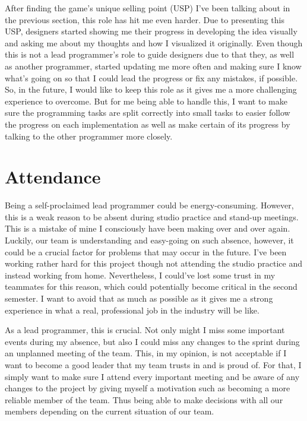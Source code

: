 \documentclass{scrartcl}
\begin{document}
After finding the game's unique selling point (USP) I've been talking about in the previous section, this role has hit me even harder. Due to presenting this USP, designers started showing me their progress in developing the idea visually and asking me about my thoughts and how I visualized it originally. Even though this is not a lead programmer's role to guide designers due to that they, as well as another programmer, started updating me more often and making sure I know what's going on so that I could lead the progress or fix any mistakes, if possible. So, in the future, I would like to keep this role as it gives me a more challenging experience to overcome. But for me being able to handle this, I want to make sure the programming tasks are split correctly into small tasks to easier follow the progress on each implementation as well as make certain of its progress by talking to the other programmer more closely.

\section{Attendance}
Being a self-proclaimed lead programmer could be energy-consuming. However, this is a weak reason to be absent during studio practice and stand-up meetings. This is a mistake of mine I consciously have been making over and over again. Luckily, our team is understanding and easy-going on such absence, however, it could be a crucial factor for problems that may occur in the future. I've been working rather hard for this project though not attending the studio practice and instead working from home. Nevertheless, I could've lost some trust in my teammates for this reason, which could potentially become critical in the second semester. I want to avoid that as much as possible as it gives me a strong experience in what a real, professional job in the industry will be like. 

As a lead programmer, this is crucial. Not only might I miss some important events during my absence, but also I could miss any changes to the sprint during an unplanned meeting of the team. This, in my opinion, is not acceptable if I want to become a good leader that my team trusts in and is proud of. For that, I simply want to make sure I attend every important meeting and be aware of any changes to the project by giving myself a motivation such as becoming a more reliable member of the team. Thus being able to make decisions with all our members depending on the current situation of our team. 
\end{document}
